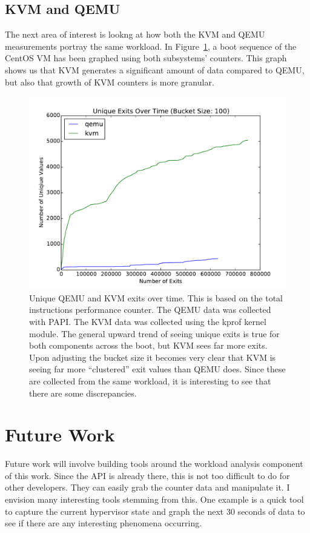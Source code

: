 \documentclass[notitlepage]{article}
\begin{document}
\subsection{KVM and QEMU}
The next area of interest is lookng at how both the KVM and QEMU measurements
portray the same workload. In Figure~\ref{fig:qemukvm}, a boot sequence of the
CentOS VM has been graphed using both subsystems' counters. This graph shows us
that KVM generates a significant amount of data compared to QEMU, but also that
growth of KVM counters is more granular.


\begin{figure}[htpb!]
\centering
\includegraphics[width=1\textwidth]{qemu_kvm_overtime.pdf}
\caption{Unique QEMU and KVM exits over time. This is based on the total
instructions performance counter. The QEMU data was collected with PAPI. The KVM
data was collected using the kprof kernel module. The general upward trend of
seeing unique exits is true for both components across the boot, but KVM sees
far more exits. Upon adjusting the bucket size it becomes very clear that KVM
is seeing far more ``clustered'' exit values than QEMU does. Since these are
collected from the same workload, it is interesting to see that there are some
discrepancies.}
\label{fig:qemukvm}
\end{figure}


\section{Future Work}
\label{sec:futurework}
Future work will involve building tools around the workload analysis component
of this work. Since the API is already there, this is not too difficult to do
for other developers. They can easily grab the counter data and manipulate it. I
envision many interesting tools stemming from this. One example is a quick tool
to capture the current hypervisor state and graph the next 30 seconds of data to
see if there are any interesting phenomena occurring.
\end{document}
